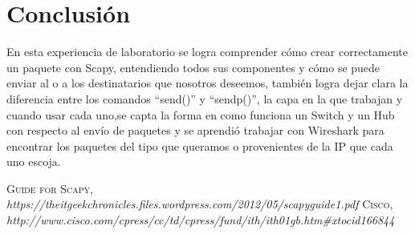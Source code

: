 \documentclass{udpreport}
\begin{document}
\chapter{Conclusión}
  	      En esta experiencia de laboratorio se logra comprender cómo crear correctamente un paquete con Scapy,
  	      entendiendo todos sus componentes y cómo se puede enviar al o a los destinatarios que nosotros deseemos, también
  	      logra dejar clara la diferencia entre los comandos “send()” y “sendp()”, la capa en la que trabajan y cuando usar cada
  	      uno,se capta la forma en como funciona un Switch y un Hub con respecto al envío de paquetes y se aprendió trabajar con
  	      Wireshark para encontrar los paquetes del tipo que queramos o provenientes de la IP que cada uno  escoja.
\begin{thebibliography}{x}
 \textsc{Guide for Scapy},
\textit{https://theitgeekchronicles.files.wordpress.com/2012/05/scapyguide1.pdf}
 \textsc{Cisco},
\textit{ http://www.cisco.com/cpress/cc/td/cpress/fund/ith/ith01gb.htm#xtocid166844}
\end{thebibliography}
\end{document}
